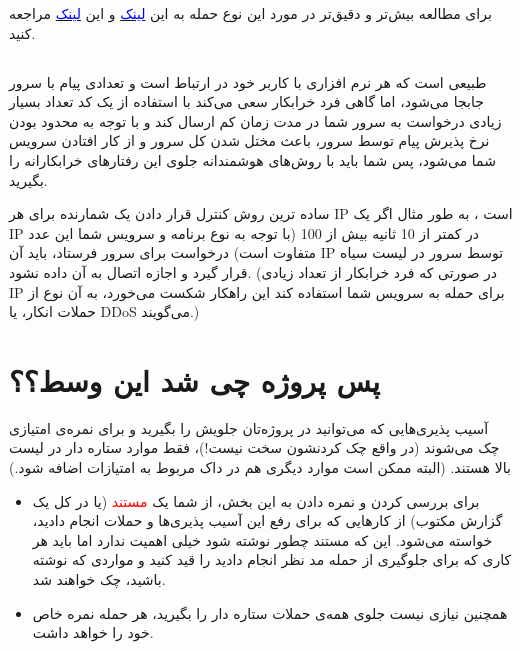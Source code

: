 \documentclass[]{article}
\begin{document}
برای مطالعه بیش‌تر و دقیق‌تر در مورد این نوع حمله به این \href{https://www.imperva.com/learn/application-security/man-in-the-middle-attack-mitm/}{\textcolor{blue}{لینک}}
 و این \href{https://en.wikipedia.org/wiki/Man-in-the-middle_attack}{\textcolor{blue}{لینک}} مراجعه کنید.





\subsection*{{}}
طبیعی است که هر نرم افزاری با کاربر خود در ارتباط است و تعدادی پیام با سرور جابجا می‌شود، اما گاهی فرد خرابکار سعی می‌کند با استفاده از یک کد تعداد بسیار زیادی درخواست به سرور شما در مدت زمان کم ارسال کند و با توجه به محدود بودن نرخ پذیرش پیام توسط سرور‌، باعث مختل شدن کل سرور و از کار افتادن سرویس شما می‌شود، پس شما باید با روش‌های هوشمندانه جلوی این رفتارهای خرابکارانه را بگیرید.
\bigskip

ساده ترین روش کنترل قرار دادن یک شمارنده برای هر IP است ، به طور مثال اگر یک IP در کمتر از 10 ثانیه بیش از 100 (با توجه به نوع برنامه و سرویس شما این عدد متفاوت است) درخواست برای سرور فرستاد، باید آن IP توسط سرور در لیست سیاه قرار گیرد و اجازه اتصال به آن داده نشود. (در صورتی که فرد خرابکار از تعداد زیادی IP برای حمله به سرویس شما استفاده کند این راهکار شکست می‌خورد، به آن نوع از حملات انکار،  یا DDoS می‌گویند.)

\section*{{\titr پس پروژه چی شد این وسط؟؟}}
آسیب پذیری‌هایی که می‌توانید در پروژه‌تان جلویش را بگیرید و برای نمره‌ی امتیازی چک می‌شوند (در واقع چک کردنشون سخت نیست!‌)، فقط موارد ستاره دار در لیست بالا هستند. (‌البته ممکن است موارد دیگری هم در داک مربوط به امتیازات اضافه شود.)

\begin{itemize}
\item
برای بررسی کردن و نمره دادن به این بخش، از شما یک \textcolor{red}{مستند} (یا در کل یک گزارش مکتوب) از کارهایی که برای رفع این آسیب پذیری‌ها و حملات انجام دادید، خواسته می‌‌شود. این که مستند چطور نوشته شود خیلی اهمیت ندارد اما باید هر کاری که برای جلوگیری از حمله مد نظر انجام دادید را قید کنید و مواردی که نوشته باشید، چک خواهند شد.
\item
همچنین نیازی نیست جلوی همه‌ی حملات ستاره دار را بگیرید‌،‌ هر حمله نمره خاص خود را خواهد داشت.
\end{itemize}
\end{document}
